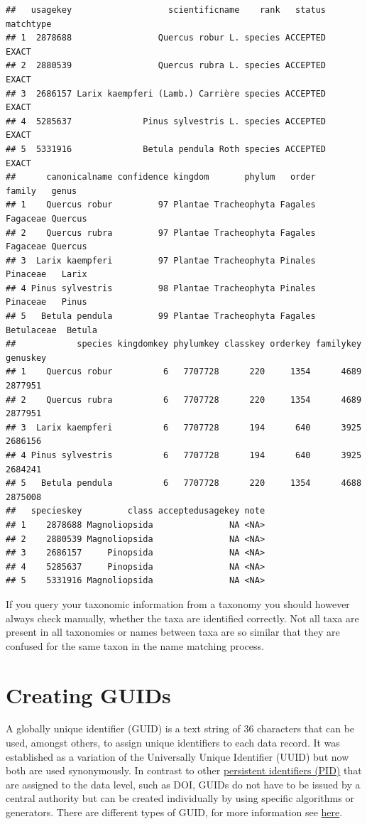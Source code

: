\documentclass[
]{book}
\begin{document}
\begin{verbatim}
##   usagekey                   scientificname    rank   status matchtype
## 1  2878688                 Quercus robur L. species ACCEPTED     EXACT
## 2  2880539                 Quercus rubra L. species ACCEPTED     EXACT
## 3  2686157 Larix kaempferi (Lamb.) Carrière species ACCEPTED     EXACT
## 4  5285637              Pinus sylvestris L. species ACCEPTED     EXACT
## 5  5331916              Betula pendula Roth species ACCEPTED     EXACT
##      canonicalname confidence kingdom       phylum   order     family   genus
## 1    Quercus robur         97 Plantae Tracheophyta Fagales   Fagaceae Quercus
## 2    Quercus rubra         97 Plantae Tracheophyta Fagales   Fagaceae Quercus
## 3  Larix kaempferi         97 Plantae Tracheophyta Pinales   Pinaceae   Larix
## 4 Pinus sylvestris         98 Plantae Tracheophyta Pinales   Pinaceae   Pinus
## 5   Betula pendula         99 Plantae Tracheophyta Fagales Betulaceae  Betula
##            species kingdomkey phylumkey classkey orderkey familykey genuskey
## 1    Quercus robur          6   7707728      220     1354      4689  2877951
## 2    Quercus rubra          6   7707728      220     1354      4689  2877951
## 3  Larix kaempferi          6   7707728      194      640      3925  2686156
## 4 Pinus sylvestris          6   7707728      194      640      3925  2684241
## 5   Betula pendula          6   7707728      220     1354      4688  2875008
##   specieskey         class acceptedusagekey note
## 1    2878688 Magnoliopsida               NA <NA>
## 2    2880539 Magnoliopsida               NA <NA>
## 3    2686157     Pinopsida               NA <NA>
## 4    5285637     Pinopsida               NA <NA>
## 5    5331916 Magnoliopsida               NA <NA>
\end{verbatim}

If you query your taxonomic information from a taxonomy you should however always check manually, whether the taxa are identified correctly. Not all taxa are present in all taxonomies or names between taxa are so similar that they are confused for the same taxon in the name matching process.

\hypertarget{GUIDcreation}{%
\section{Creating GUIDs}\label{GUIDcreation}}

A globally unique identifier (GUID) is a text string of 36 characters that can be used, amongst others, to assign unique identifiers to each data record. It was established as a variation of the Universally Unique Identifier (UUID) but now both are used synonymously. In contrast to other \protect\hyperlink{PID}{persistent identifiers (PID)} that are assigned to the data level, such as DOI, GUIDs do not have to be issued by a central authority but can be created individually by using specific algorithms or generators. There are different types of GUID, for more information see \href{https://www.techtarget.com/searchwindowsserver/definition/GUID-global-unique-identifier}{here}.
\end{document}
